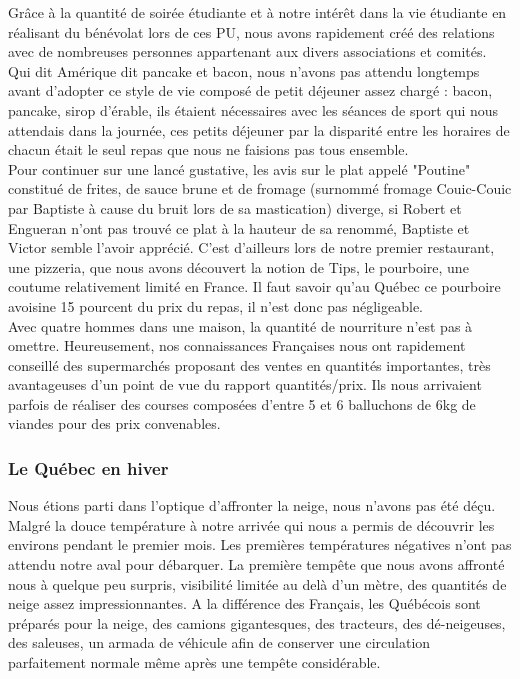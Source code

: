 Grâce à la quantité de soirée étudiante et à notre intérêt dans la vie étudiante en réalisant du bénévolat lors de ces PU, nous avons rapidement créé des relations avec de nombreuses personnes appartenant aux divers associations et comités.\\

Qui dit Amérique dit pancake et bacon, nous n’avons pas attendu longtemps avant d’adopter ce style de vie composé de petit déjeuner assez chargé : bacon, pancake, sirop d’érable, ils étaient nécessaires avec les séances de sport qui nous attendais dans la journée, ces petits déjeuner par la disparité entre les horaires de chacun était le seul repas que nous ne faisions pas tous ensemble. \\

Pour continuer sur une lancé gustative, les avis sur le plat appelé "Poutine" constitué de frites, de sauce brune et de fromage (surnommé fromage Couic-Couic par Baptiste à cause du bruit lors de sa mastication) diverge, si Robert et Engueran n'ont pas trouvé ce plat à la hauteur de sa renommé, Baptiste et Victor semble l'avoir apprécié. C'est d'ailleurs lors de notre premier restaurant, une pizzeria, que nous avons découvert la notion de Tips, le pourboire, une coutume relativement limité en France. Il faut savoir qu'au Québec ce pourboire avoisine 15 pourcent du prix du repas, il n'est donc pas négligeable.\\

Avec quatre hommes dans une maison, la quantité de nourriture n'est pas à omettre. Heureusement, nos connaissances Françaises nous ont rapidement conseillé des supermarchés proposant des ventes en quantités importantes, très avantageuses d'un point de vue du rapport quantités/prix. Ils nous arrivaient parfois de réaliser des courses composées d'entre 5 et 6 balluchons de 6kg de viandes pour des prix convenables.

\subsubsection{Le Québec en hiver}

Nous étions parti dans l'optique d'affronter la neige, nous n'avons pas été déçu. Malgré la douce température à notre arrivée qui nous a permis de découvrir les environs pendant le premier mois. Les premières températures négatives n'ont pas attendu notre aval pour débarquer. La première tempête que nous avons affronté nous à quelque peu surpris, visibilité limitée au delà d'un mètre, des quantités de neige assez impressionnantes. A la différence des Français, les Québécois sont préparés pour la neige, des camions gigantesques, des tracteurs, des dé-neigeuses, des saleuses, un armada de véhicule afin de conserver une circulation parfaitement normale même après une tempête considérable.\\

